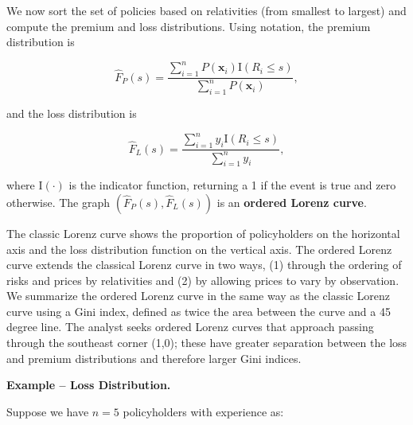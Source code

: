 \documentclass[]{book}
\theoremstyle{definition}
\theoremstyle{definition}
\theoremstyle{definition}
\theoremstyle{remark}
\begin{document}
We now sort the set of policies based on relativities (from smallest to
largest) and compute the premium and loss distributions. Using notation,
the premium distribution is

\begin{equation}
\hat{F}_P(s) =  \frac{ \sum_{i=1}^n
P(\mathbf{x}_i) \mathrm{I}(R_i \leq s) }{\sum_{i=1}^n P(\mathbf{x}_i)} ,\label{eq:EmpPremDF}
\end{equation}

and the loss distribution is

\begin{equation}
\hat{F}_{L}(s) =  \frac{ \sum_{i=1}^n y_i \mathrm{I}(R_i
\leq s) }{\sum_{i=1}^n y_i} ,\label{eq:EmpLossDF}
\end{equation}

where \(\mathrm{I}(\cdot)\) is the indicator function, returning a 1 if
the event is true and zero otherwise. The graph
\(\left(\hat{F}_P(s),\hat{F}_{L}(s) \right)\) is an \textbf{ordered
Lorenz curve}.

The classic Lorenz curve shows the proportion of policyholders on the
horizontal axis and the loss distribution function on the vertical axis.
The ordered Lorenz curve extends the classical Lorenz curve in two ways,
(1) through the ordering of risks and prices by relativities and (2) by
allowing prices to vary by observation. We summarize the ordered Lorenz
curve in the same way as the classic Lorenz curve using a Gini index,
defined as twice the area between the curve and a 45 degree line. The
analyst seeks ordered Lorenz curves that approach passing through the
southeast corner (1,0); these have greater separation between the loss
and premium distributions and therefore larger Gini indices.

\textbf{Example -- Loss Distribution.}

Suppose we have \(n=5\) policyholders with experience as:
\end{document}
